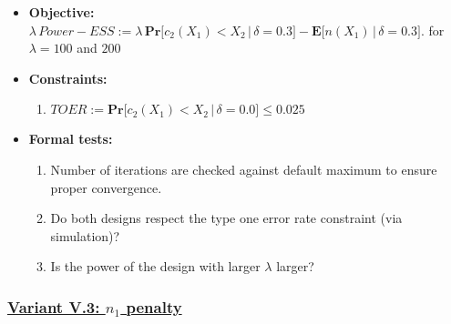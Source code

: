 \documentclass[]{book}
\providecommand{\tightlist}{%
  \setlength{\itemsep}{0pt}\setlength{\parskip}{0pt}}
\begin{document}
\begin{itemize}
\tightlist
\item
  \textbf{Objective:} \(\lambda\, Power - ESS := \lambda\, \boldsymbol{Pr}\big[c_2(X_1) < X_2\,|\,\delta=0.3\big] - \boldsymbol{E}\big[n(X_1)\,|\,\delta=0.3\big].\)
  for \(\lambda = 100\) and \(200\)
\item
  \textbf{Constraints:}

  \begin{enumerate}
  \def\labelenumi{\arabic{enumi}.}
  \tightlist
  \item
    \(TOER := \boldsymbol{Pr}\big[c_2(X_1) < X_2\,|\,\delta=0.0\big] \leq 0.025\)
  \end{enumerate}
\item
  \textbf{Formal tests:}

  \begin{enumerate}
  \def\labelenumi{\arabic{enumi}.}
  \tightlist
  \item
    Number of iterations are checked against default maximum to ensure proper
    convergence.
  \item
    Do both designs respect the type one error rate constraint (via simulation)?
  \item
    Is the power of the design with larger \(\lambda\) larger?
  \end{enumerate}
\end{itemize}

\hypertarget{variant-v.3-n_1-penalty}{%
\subsubsection{\texorpdfstring{\protect\hyperlink{variantV_3}{Variant V.3: \(n_1\) penalty}}{Variant V.3: n\_1 penalty}}\label{variant-v.3-n_1-penalty}}
\end{document}
